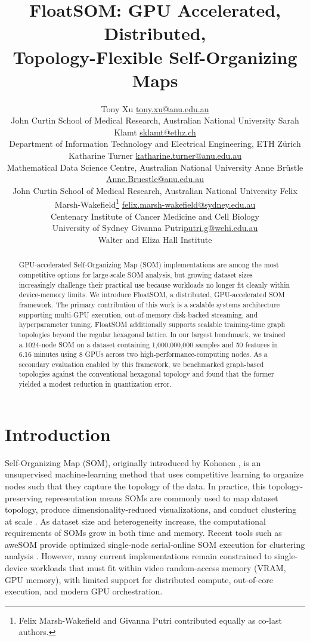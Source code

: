 \documentclass[10pt]{article} %
\title{FloatSOM: GPU Accelerated, Distributed,\\Topology-Flexible Self-Organizing Maps}
\author{\name Tony Xu \email \href{mailto:tony.xu@anu.edu.au}{tony.xu@anu.edu.au} \\
        \addr John Curtin School of Medical Research, Australian National University
        \AND
        \name Sarah Klamt \email \href{mailto:sklamt@ethz.ch}{sklamt@ethz.ch} \\
        \addr Department of Information Technology and Electrical Engineering, ETH Z\"urich
        \AND
        \name Katharine Turner \email \href{mailto:katharine.turner@anu.edu.au}{katharine.turner@anu.edu.au} \\
        \addr Mathematical Data Science Centre, Australian National University
        \AND
        \name Anne Br\"ustle \email \href{mailto:Anne.Bruestle@anu.edu.au}{Anne.Bruestle@anu.edu.au} \\
        \addr John Curtin School of Medical Research, Australian National University
        \AND
        \name Felix Marsh-Wakefield\thanks{Felix Marsh-Wakefield and Givanna Putri contributed equally as co-last authors.} \email \href{mailto:felix.marsh-wakefield@sydney.edu.au}{felix.marsh-wakef{}ield@sydney.edu.au} \\
        \addr Centenary Institute of Cancer Medicine and Cell Biology\\
        University of Sydney
        \AND
        \name Givanna Putri\footnotemark[1] \email \href{mailto:putri.g@wehi.edu.au}{putri.g@wehi.edu.au} \\
        \addr Walter and Eliza Hall Institute}
\begin{document}
\raggedbottom

\maketitle

\begin{abstract}
GPU-accelerated Self-Organizing Map (SOM) implementations are among the most competitive options for large-scale SOM analysis, but growing dataset sizes increasingly challenge their practical use because workloads no longer fit cleanly within device-memory limits. We introduce FloatSOM, a distributed, GPU-accelerated SOM framework. The primary contribution of this work is a scalable systems architecture supporting multi-GPU execution, out-of-memory disk-backed streaming, and hyperparameter tuning. FloatSOM additionally supports scalable training-time graph topologies beyond the regular hexagonal lattice. In our largest benchmark, we trained a 1024-node SOM on a dataset containing 1,000,000,000 samples and 50 features in 6.16 minutes using 8 GPUs across two high-performance-computing nodes. As a secondary evaluation enabled by this framework, we benchmarked graph-based topologies against the conventional hexagonal topology and found that the former yielded a modest reduction in quantization error.
\end{abstract}

\section{Introduction}

Self-Organizing Map (SOM), originally introduced by Kohonen \citep{kohonenSelforganizingMap1990}, is an unsupervised machine-learning method that uses competitive learning to organize nodes such that they capture the topology of the data. In practice, this topology-preserving representation means SOMs are commonly used to map dataset topology, produce dimensionality-reduced visualizations, and conduct clustering at scale \citep{kangasVariantsSelforganizingMaps1990}. As dataset size and heterogeneity increase, the computational requirements of SOMs grow in both time and memory. Recent tools such as aweSOM provide optimized single-node serial-online SOM execution for clustering analysis \citep{haAweSOMCPUGPUaccelerated2025}. However, many current implementations remain constrained to single-device workloads that must fit within video random-access memory (VRAM, GPU memory), with limited support for distributed compute, out-of-core execution, and modern GPU orchestration.
\end{document}
